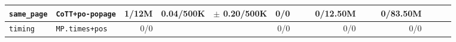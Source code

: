 \begin{tabular}{l l  | r r l | r r l | r r l | r r l l}
      \verb|same_page| &                                      \verb|CoTT+po-popage| &          1/12M &             0.04/500K &   $\pm$ 0.20/500K &            0/0 &                       &  &       0/12.50M &                       &                   &       0/83.50M &                       &                   & \\ \hline 
         \verb|timing| &                                        \verb|MP.times+pos| &            0/0 &                       &                   &            0/0 &                       &  &            0/0 &                       &                   &            0/0 &                       &                   & \\ \hline 
\end{tabular}
